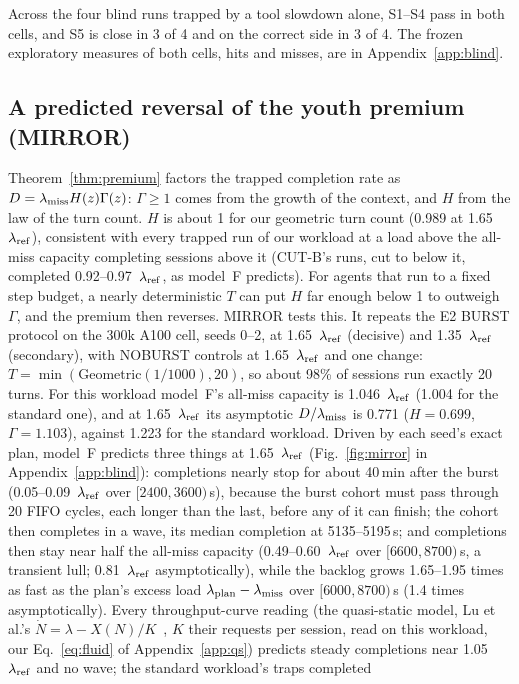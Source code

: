 Across the four blind runs trapped by a tool slowdown alone, S1--S4 pass in both cells, and S5 is close in 3 of 4 and on the correct
side in 3 of 4. The frozen exploratory measures of both cells, hits and misses, are in Appendix~\ref{app:blind}.

\subsection{A predicted reversal of the youth premium (MIRROR)}\label{sec:mirror}

Theorem~\ref{thm:premium} factors the trapped completion rate as $D=\lambda_{\mathrm{miss}} H(z)\Gamma(z)$: $\Gamma\ge1$ comes from the growth of
the context, and $H$ from the law of the turn count. $H$ is about 1 for our geometric turn count (0.989 at 1.65~$\lambda_{\mathrm{ref}}$), consistent
with every trapped run of our workload at a load above the all-miss capacity completing sessions above it (CUT-B's runs, cut to below it,
completed 0.92--0.97~$\lambda_{\mathrm{ref}}$, as model~F predicts). For agents that run to a fixed step budget, a nearly
deterministic $T$ can put $H$ far enough below 1 to outweigh $\Gamma$, and the premium then reverses. MIRROR tests this. It repeats the E2
BURST protocol on the 300k A100 cell, seeds 0--2, at 1.65~$\lambda_{\mathrm{ref}}$ (decisive) and 1.35~$\lambda_{\mathrm{ref}}$ (secondary), with NOBURST
controls at 1.65~$\lambda_{\mathrm{ref}}$ and one change: $T=\min(\mathrm{Geometric}(1/1000),20)$, so about 98\% of sessions run exactly 20 turns. For this
workload model~F's all-miss capacity is 1.046~$\lambda_{\mathrm{ref}}$ (1.004 for the standard one), and at 1.65~$\lambda_{\mathrm{ref}}$ its asymptotic $D/\lambda_{\mathrm{miss}}$
is 0.771 ($H=0.699$, $\Gamma=1.103$), against 1.223 for the standard workload. Driven by each seed's exact plan, model~F predicts
three things at 1.65~$\lambda_{\mathrm{ref}}$ (Fig.~\ref{fig:mirror} in Appendix~\ref{app:blind}): completions nearly stop for about 40\,min after the burst (0.05--0.09~$\lambda_{\mathrm{ref}}$
over $[2400,3600)$\,s), because the burst cohort must pass through 20 FIFO cycles, each longer than the last, before any of it can
finish; the cohort then completes in a wave, its median completion at 5135--5195\,s; and completions then stay near half the
all-miss capacity (0.49--0.60~$\lambda_{\mathrm{ref}}$ over $[6600,8700)$\,s, a transient lull; 0.81~$\lambda_{\mathrm{ref}}$ asymptotically), while the backlog grows 1.65--1.95 times as fast as the plan's excess load $\lambda_{\mathrm{plan}}-\lambda_{\mathrm{miss}}$ over $[6000,8700)$\,s (1.4 times asymptotically). Every
throughput-curve reading (the quasi-static model, Lu et al.'s $\dot N=\lambda-X(N)/K$~\citep{lu2026cachetrap}, $K$ their requests per session, read on this workload,
our Eq.~\eqref{eq:fluid} of Appendix~\ref{app:qs}) predicts steady completions near 1.05~$\lambda_{\mathrm{ref}}$ and no wave; the standard workload's traps completed
